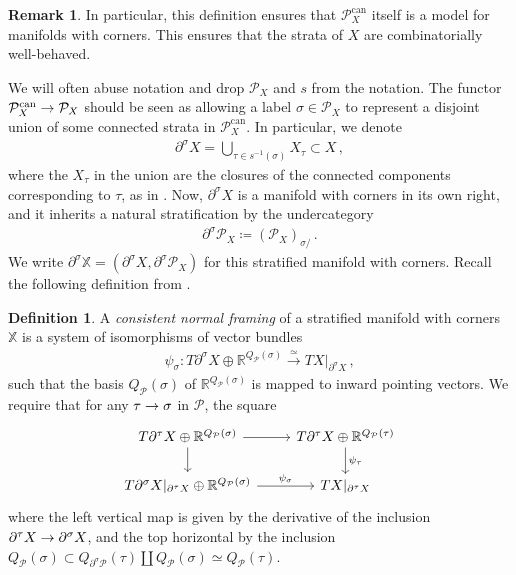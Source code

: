 \documentclass[10pt]{amsart}
\numberwithin{equation}{section}
\theoremstyle{definition}
\newtheorem{definition}[prop]{Definition}
\newtheorem{rem}[prop]{Remark}
\DeclareMathOperator{\can}{can}
\newcommand{\bR}{\mathbb{R}}
\newcommand{\bX}{\mathbb{X}}
\newcommand{\cP}{\mathcal{P}}
\newcommand{\del}{\partial}
\renewcommand{\to}{\mathchoice{\longrightarrow}{\rightarrow}{}{}}
\begin{document}
\begin{rem}\label{rem:stratified_vs_faces}
	In particular, this definition ensures that $\cP^{\can}_X$ itself is a model for manifolds with corners.
	This ensures that the strata of $X$ are combinatorially well-behaved.
\end{rem}

We will often abuse notation and drop $\cP_X$ and $s$ from the notation.
The functor $\cP_X^{\can}\to \cP_X$ should be seen as allowing a label $\sigma \in \cP_X$ to represent a disjoint union of some connected strata in $\cP_X^{\can}$.
In particular, we denote
\begin{align*}
	\del^{\sigma}X = \bigcup_{\tau \in s^{-1}(\sigma)} X_{\tau} \subset X \,,
\end{align*}
where the $X_\tau$ in the union are the closures of the connected components corresponding to $\tau$, as in .
Now, $\del^{\sigma}X$ is a manifold with corners in its own right, and it inherits a natural stratification by the undercategory
\begin{align*}
	\del^{\sigma}\cP_{X} \coloneq (\cP_{X})_{\sigma/} \,.
\end{align*}
We write $\del^{\sigma} \bX = (\del^{\sigma}X, \del^{\sigma} \cP_{X})$ for this stratified manifold with corners.
Recall the following definition from \cite[Definition 2.25]{AB}.

\begin{definition}\label{def:consistent_normal_framing}
	A \emph{consistent normal framing} of a stratified manifold with corners~$\bX$ is a system of isomorphisms of vector bundles
	\begin{align*}
		\psi_{\sigma}\colon T\del^{\sigma} X \oplus \bR^{Q_{\cP}(\sigma)} \xrightarrow{\simeq} TX\vert_{\del^{\sigma}X} \,,
	\end{align*}
	such that the basis $Q_{\cP}(\sigma)$ of $\bR^{Q_{\cP}(\sigma)}$ is mapped to inward pointing vectors.
	We require that for any $\tau \to \sigma$ in $\cP$, the square
	\begin{equation*}
		\begin{tikzcd}
			T\del^{\tau} X\oplus \bR^{Q_{\cP}(\sigma)} \arrow[r] \arrow[d]      &   T\del^{\tau}X \oplus \bR^{Q_{\cP}(\tau)}  \arrow[d, "\psi_{\tau}"] \\
			T \del^{\sigma}X\vert_{\del^{\tau}X} \oplus \bR^{Q_{\cP}(\sigma)}  \arrow[r, "\psi_{\sigma}"]               &  TX\vert_{\del^{\tau}X}
		\end{tikzcd}
	\end{equation*}
	where the left vertical map is given by the derivative of the inclusion $\del^{\tau}X\to \del^{\sigma}X$, and the top horizontal by the inclusion $Q_{\cP}(\sigma) \subset Q_{\del^{\sigma}\cP}(\tau)\amalg  Q_{\cP}(\sigma) \simeq Q_{\cP}(\tau)$.
\end{definition}
\end{document}
